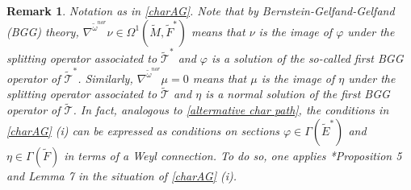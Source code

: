 \documentclass[11pt]{amsart}
\newtheorem{remark}[proposition]{Remark}
\begin{document}
\begin{remark}\label{BGG background}
Notation as in \cref{charAG}. Note that by Bernstein-Gelfand-Gelfand (BGG) theory, $\nabla^{\tilde\omega^{nor}}\nu\in\Omega^1(\tilde M,\tilde{F}^*)$ means that $\nu$ is the image of $\varphi$ under the splitting operator associated to $\tilde{\mathcal T}^*$ and $\varphi$ is a solution of the so-called first BGG operator of $\tilde{\mathcal T}^*$. Similarly, $\nabla^{\tilde\omega^{nor}}\mu=0$ means that $\mu$ is the image of $\eta$ under the splitting operator associated to $\tilde{\mathcal T}$ and $\eta$ is a normal solution of the first BGG operator of $\tilde{\mathcal T}$. In fact, analogous to \cref{altermative char path}, the conditions in \cref{charAG} (i) can be expressed as conditions on sections $\varphi\in\Gamma(\tilde E^*)$ and $\eta\in\Gamma(\tilde F)$ in terms of a Weyl connection. To do so, one applies \cite{Guo}*{Proposition 5 and Lemma 7} in the situation of \cref{charAG} (i).
\end{remark}
\end{document}
